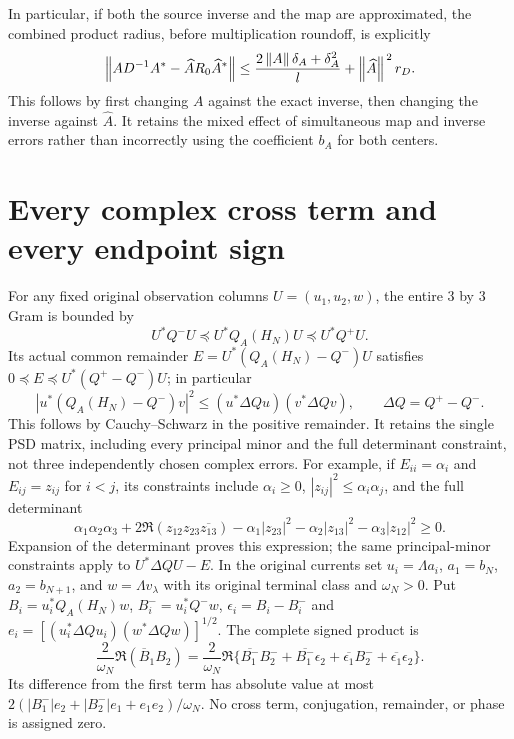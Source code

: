 In particular, if both the source inverse and the map are
approximated, the combined product radius, before multiplication
roundoff, is explicitly
\[
 \left\lVert AD^{-1}A^*-\widehat A R_0\widehat A^*\right\rVert
 \le \frac{2\left\lVert A\right\rVert\delta_A+\delta_A^2}{l}
                  +\left\lVert\widehat A\right\rVert^{\,2}r_D.
\]
This follows by first changing $A$ against the exact inverse,
then changing the inverse against $\widehat A$. It retains the
mixed effect of simultaneous map and inverse errors rather than
incorrectly using the coefficient $b_A$ for both centers.

\section{Every complex cross term and every endpoint sign}

For any fixed original observation columns $U=(u_1,u_2,w)$,
the entire $3$ by $3$ Gram is bounded by
\[
 U^*Q^-U\preceq U^*Q_A(H_N)U\preceq U^*Q^+U.
\]
Its actual common remainder $E=U^*(Q_A(H_N)-Q^-)U$ satisfies
$0\preceq E\preceq U^*(Q^+-Q^-)U$; in particular
\begin{equation}\label{mprec:eq:cross}
 |u^*(Q_A(H_N)-Q^-)v|^2
 \le(u^*\Delta Q u)(v^*\Delta Q v),\qquad\Delta Q=Q^+-Q^-.
\end{equation}
This follows by Cauchy--Schwarz in the positive remainder. It
retains the single PSD matrix, including every principal minor and
the full determinant constraint, not three independently chosen
complex errors. For example, if $E_{ii}=\alpha_i$ and
$E_{ij}=z_{ij}$ for $i<j$, its constraints include $\alpha_i\ge0$,
$|z_{ij}|^2\le\alpha_i\alpha_j$, and the full determinant
\[
 \alpha_1\alpha_2\alpha_3
 +2\Re(z_{12}z_{23}\overline{z_{13}})
 -\alpha_1|z_{23}|^2-\alpha_2|z_{13}|^2-\alpha_3|z_{12}|^2
 \ge0.
\]
Expansion of the determinant proves this expression; the same
principal-minor constraints apply to $U^*\Delta Q U-E$.
In the original currents set
$u_i=\Lambda a_i$, $a_1=b_N$, $a_2=b_{N+1}$, and
$w=\Lambda v_\lambda$ with its original terminal class and
$\omega_N>0$. Put $B_i=u_i^*Q_A(H_N)w$, $B_i^-=u_i^*Q^-w$,
$\epsilon_i=B_i-B_i^-$ and
$e_i=[(u_i^*\Delta Q u_i)(w^*\Delta Q w)]^{1/2}$.
The complete signed product is
\begin{equation}\label{mprec:eq:current}
 \frac{2}{\omega_N}\Re(\overline B_1B_2)
 =\frac{2}{\omega_N}\Re\{
 \overline{B_1^-}B_2^-+\overline{B_1^-}\epsilon_2
 +\overline{\epsilon_1}B_2^-+\overline{\epsilon_1}\epsilon_2\}.
\end{equation}
Its difference from the first term has absolute value at most
$2(|B_1^-|e_2+|B_2^-|e_1+e_1e_2)/\omega_N$.
No cross term, conjugation, remainder, or phase is assigned zero.

